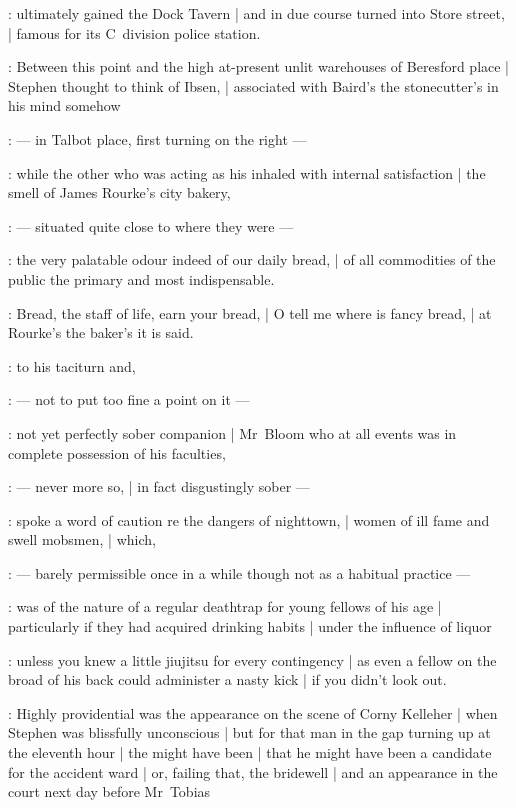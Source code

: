 :
ultimately gained the Dock Tavern |
and in due course turned into Store street, |
famous for its C~division police station.

:
Between this point and the high at-present unlit warehouses of Beresford place |
Stephen thought to think of Ibsen, |
associated with Baird's the stonecutter's in his mind somehow

:
    --- in Talbot place, first turning on the right ---

:
while the other who was acting as his 
inhaled with internal satisfaction |
the smell of James Rourke's city bakery,

:
    --- situated quite close to where they were ---

:
the very palatable odour indeed of our daily bread, |
of all commodities of the public the primary and most indispensable.

:
Bread, the staff of life, earn your bread, |
O tell me where is fancy bread, |
at Rourke's the baker's it is said.

:
 to his taciturn and,

:
    --- not to put too fine a point on it ---

:
not yet perfectly sober companion |
Mr~Bloom who at all events was in complete possession of his faculties,

:
    --- never more so, |
        in fact disgustingly sober ---

:
spoke a word of caution re the dangers of nighttown, |
women of ill fame and swell mobsmen, |
which,

:
    --- barely permissible once in a while though not as a habitual practice ---

:
was of the nature of a regular deathtrap for young fellows of his age |
particularly if they had acquired drinking habits |
under the influence of liquor

:
unless you knew a little jiujitsu for every contingency |
as even a fellow on the broad of his back could administer a nasty kick |
if you didn't look out.

:
Highly providential was the appearance on the scene of Corny Kelleher |
when Stephen was blissfully unconscious |
but for that man in the gap turning up at the eleventh hour |
the  might have been |
that he might have been a candidate for the accident ward |
or, failing that, the bridewell |
and an appearance in the court next day before Mr~Tobias


